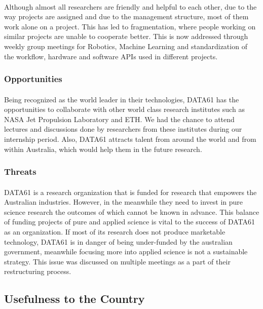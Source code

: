\paragraph{}
Although almost all researchers are friendly and helpful to each other, due to the way projects are assigned and due to the management structure, most of them work alone on a project. This has led to fragmentation, where people working on similar projects are unable to cooperate better. This is now addressed through weekly group meetings for Robotics, Machine Learning and standardization of the workflow, hardware and software APIs used in different projects.


\subsubsection*{Opportunities}
\paragraph{}
Being recognized as the world leader in their technologies, DATA61 has the opportunities to collaborate with other world class research institutes such as NASA Jet Propulsion Laboratory and ETH. We had the chance to attend lectures and discussions done by researchers from these institutes during our internship period. Also, DATA61 attracts talent from around the world and from within Australia, which would help them in the future research.

\subsubsection*{Threats}
\paragraph{}
DATA61 is a research organization that is funded for research that empowers the Australian industries. However, in the meanwhile they need to invest in pure science research the outcomes of which cannot be known in advance. This balance of funding projects of pure and applied science is vital to the success of DATA61 as an organization. If most of its research does not produce marketable technology, DATA61 is in danger of being under-funded by the australian government, meanwhile focusing more into applied science is not a sustainable strategy. This issue was discussed on multiple meetings as a part of their restructuring process.


\subsection{Usefulness to the Country}
